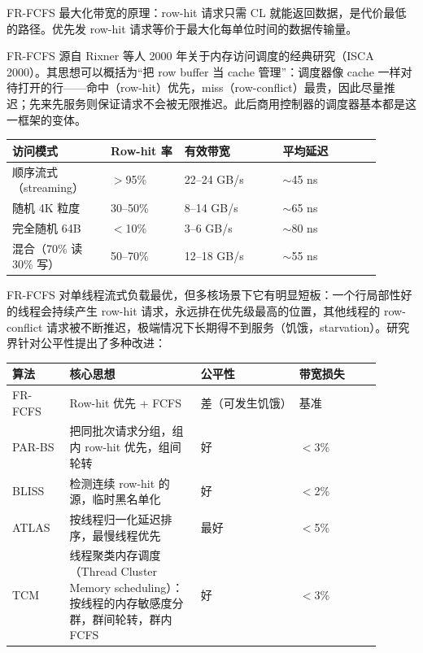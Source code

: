 FR-FCFS 最大化带宽的原理：row-hit 请求只需 CL 就能返回数据，是代价最低的路径。优先发 row-hit 请求等价于最大化每单位时间的数据传输量。

\begin{classicnote}
FR-FCFS 源自 Rixner 等人 2000 年关于内存访问调度的经典研究（ISCA 2000）。其思想可以概括为“把 row buffer 当 cache 管理”：调度器像 cache 一样对待打开的行——命中（row-hit）优先，miss（row-conflict）最贵，因此尽量推迟；先来先服务则保证请求不会被无限推迟。此后商用控制器的调度器基本都是这一框架的变体。
\end{classicnote}

\begin{longtable}{L{0.24\linewidth}L{0.18\linewidth}L{0.24\linewidth}L{0.24\linewidth}}
\toprule
访问模式 & Row-hit 率 & 有效带宽 & 平均延迟 \\
\midrule
顺序流式（streaming） & $>$95\% & 22--24 GB/s & $\sim$45 ns \\\tablerowrule
随机 4K 粒度 & 30--50\% & 8--14 GB/s & $\sim$65 ns \\\tablerowrule
完全随机 64B & $<$10\% & 3--6 GB/s & $\sim$80 ns \\\tablerowrule
混合（70\% 读 30\% 写） & 50--70\% & 12--18 GB/s & $\sim$55 ns \\
\bottomrule
\end{longtable}



FR-FCFS 对单线程流式负载最优，但多核场景下它有明显短板：一个行局部性好的线程会持续产生 row-hit 请求，永远排在优先级最高的位置，其他线程的 row-conflict 请求被不断推迟，极端情况下长期得不到服务（饥饿，starvation）。研究界针对公平性提出了多种改进：

\begin{longtable}{L{0.14\linewidth}L{0.32\linewidth}L{0.24\linewidth}L{0.2\linewidth}}
\toprule
算法 & 核心思想 & 公平性 & 带宽损失 \\
\midrule
FR-FCFS & Row-hit 优先 + FCFS & 差（可发生饥饿） & 基准 \\\tablerowrule
PAR-BS & 把同批次请求分组，组内 row-hit 优先，组间轮转 & 好 & $<$3\% \\\tablerowrule
BLISS & 检测连续 row-hit 的源，临时黑名单化 & 好 & $<$2\% \\\tablerowrule
ATLAS & 按线程归一化延迟排序，最慢线程优先 & 最好 & $<$5\% \\\tablerowrule
TCM & 线程聚类内存调度（Thread Cluster Memory scheduling）：按线程的内存敏感度分群，群间轮转，群内 FCFS & 好 & $<$3\% \\
\bottomrule
\end{longtable}

